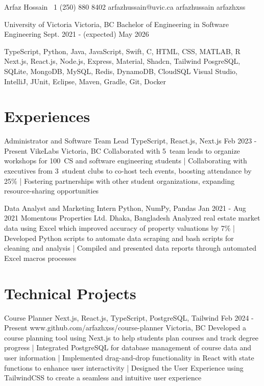 \documentclass[a4paper,10pt]{article}
\begin{document}
\header
{Arfaz Hossain}				%
{\plus\ 1 (250) 880 8402}		%
{arfazhussain@uvic.ca} 			%
{arfazhussain} 				%
{arfazhxss} 				%

\education
{University of Victoria}
{Victoria, BC}
{Bachelor of Engineering in Software Engineering}
{Sept. 2021 - (expected) May 2026}

\technicalskills
{TypeScript, Python, Java, JavaScript, Swift, C\plus\plus, HTML, CSS, MATLAB, R}
{Next.js, React.js, Node.js, Express, Material, Shadcn, Tailwind}
{PosgreSQL, SQLite, MongoDB, MySQL, Redis, DynamoDB, CloudSQL}
{Visual Studio, IntelliJ, JUnit, Eclipse, Maven, Gradle, Git, Docker}

\section{Experiences}
\workexperiences
{Administrator and Software Team Lead}
{TypeScript, React.js, Next.js}
{Feb 2023 - Present}
{VikeLabs}
{Victoria, BC}
{Collaborated with 5\plus\ team leads to organize workshops for 100\plus\ CS and software engineering students 
| Collaborating with executives from 3\plus\ student clubs to co-host tech events, boosting attendance by 25\% 
| Fostering partnerships with other student organizations, expanding resource-sharing opportunities 
}

\workexperiences
{Data Analyst and Marketing Intern}
{Python, NumPy, Pandas}
{Jan 2021 - Aug 2021}
{Momentous Properties Ltd.}
{Dhaka, Bangladesh}
{Analyzed real estate market data using Excel which improved accuracy of property valuations by 7\% 
| Developed Python scripts to automate data scraping and bash scripts for cleaning and analysis
| Compiled and presented data reports through automated Excel macros processes
}

\section{Technical Projects}
\projectentry
{Course Planner}
{Next.js, React.js, TypeScript, PostgreSQL, Tailwind}
{Feb 2024 - Present}
{www.github.com/arfazhxss/course-planner}
{Victoria, BC}
{Developed a course planning tool using Next.js to help students plan courses and track degree progress 
| Integrated PostgreSQL for database management of course data and user information 
| Implemented drag-and-drop functionality in React with state functions to enhance user interactivity 
| Designed the User Experience using TailwindCSS to create a seamless and intuitive user experience
}
\end{document}

